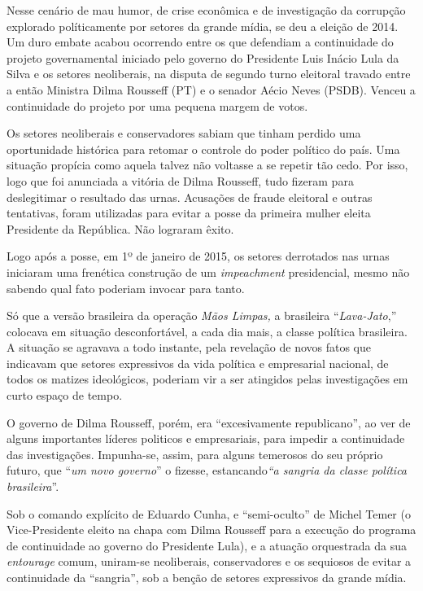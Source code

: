 Nesse cenário de mau humor, de crise econômica e de investigação da
corrupção explorado políticamente por setores da grande mídia, se deu a
eleição de 2014. Um duro embate acabou ocorrendo entre os que defendiam
a continuidade do projeto governamental iniciado pelo governo do
Presidente Luis Inácio Lula da Silva e os setores neoliberais, na
disputa de segundo turno eleitoral travado entre a então Ministra Dilma
Rousseff (PT) e o senador Aécio Neves (PSDB). Venceu a continuidade do
projeto por uma pequena margem de votos.

Os setores neoliberais e conservadores sabiam que tinham perdido uma
oportunidade histórica para retomar o controle do poder político do
país. Uma situação propícia como aquela talvez não voltasse a se repetir
tão cedo. Por isso, logo que foi anunciada a vitória de Dilma Rousseff,
tudo fizeram para deslegitimar o resultado das urnas. Acusações de
fraude eleitoral e outras tentativas, foram utilizadas para evitar a
posse da primeira mulher eleita Presidente da República. Não lograram
êxito.

Logo após a posse, em 1º de janeiro de 2015, os setores derrotados nas
urnas iniciaram uma frenética construção de um \emph{impeachment}
presidencial, mesmo não sabendo qual fato poderiam invocar para tanto.

Só que a versão brasileira da operação \emph{Mãos Limpas,} a brasileira
``\emph{Lava-Jato},'' colocava em situação desconfortável, a cada dia
mais, a classe política brasileira. A situação se agravava a todo
instante, pela revelação de novos fatos que indicavam que setores
expressivos da vida política e empresarial nacional, de todos os matizes
ideológicos, poderiam vir a ser atingidos pelas investigações em curto
espaço de tempo.

O governo de Dilma Rousseff, porém, era ``excesivamente republicano'',
ao ver de alguns importantes líderes politicos e empresariais, para
impedir a continuidade das investigações. Impunha-se, assim, para alguns
temerosos do seu próprio futuro, que ``\emph{um novo governo}'' o
fizesse, estancando\emph{``a sangria da classe política brasileira}''.

Sob o comando explícito de Eduardo Cunha, e ``semi-oculto'' de Michel
Temer (o Vice-Presidente eleito na chapa com Dilma Rousseff para a
execução do programa de continuidade ao governo do Presidente Lula), e a
atuação orquestrada da sua \emph{entourage} comum, uniram-se
neoliberais, conservadores e os sequiosos de evitar a continuidade da
``sangria'', sob a benção de setores expressivos da grande mídia.


